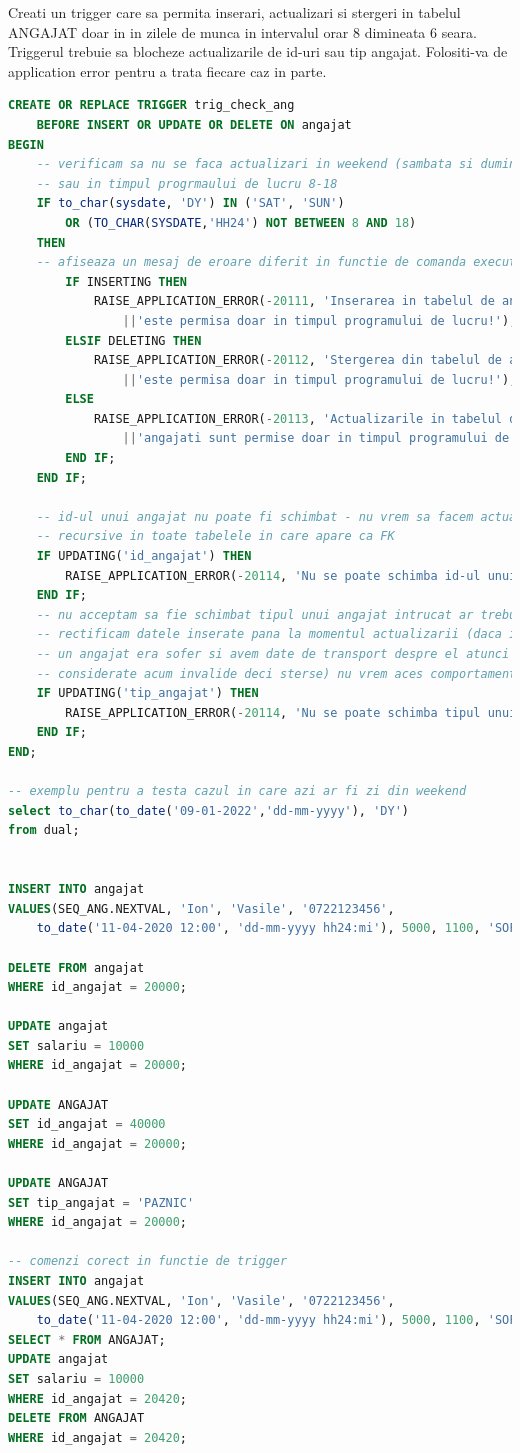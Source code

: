 \documentclass[12pt, a4paper]{article}
\begin{document}
Creati un trigger care sa permita inserari, actualizari si stergeri in
tabelul ANGAJAT doar in in zilele de munca in intervalul orar 8 dimineata
6 seara. Triggerul trebuie sa blocheze actualizarile de id-uri sau tip
angajat. Folositi-va de application error pentru a trata fiecare caz in parte.
\begin{lstlisting}[language=SQL]
CREATE OR REPLACE TRIGGER trig_check_ang
    BEFORE INSERT OR UPDATE OR DELETE ON angajat
BEGIN
    -- verificam sa nu se faca actualizari in weekend (sambata si duminica) 
    -- sau in timpul progrmaului de lucru 8-18
    IF to_char(sysdate, 'DY') IN ('SAT', 'SUN')
        OR (TO_CHAR(SYSDATE,'HH24') NOT BETWEEN 8 AND 18)
    THEN
    -- afiseaza un mesaj de eroare diferit in functie de comanda executata
        IF INSERTING THEN
            RAISE_APPLICATION_ERROR(-20111, 'Inserarea in tabelul de angajati '
                ||'este permisa doar in timpul programului de lucru!');
        ELSIF DELETING THEN
            RAISE_APPLICATION_ERROR(-20112, 'Stergerea din tabelul de angajati '
                ||'este permisa doar in timpul programului de lucru!');
        ELSE
            RAISE_APPLICATION_ERROR(-20113, 'Actualizarile in tabelul de '
                ||'angajati sunt permise doar in timpul programului de lucru!');
        END IF;
    END IF;
    
    -- id-ul unui angajat nu poate fi schimbat - nu vrem sa facem actualizari
    -- recursive in toate tabelele in care apare ca FK
    IF UPDATING('id_angajat') THEN
        RAISE_APPLICATION_ERROR(-20114, 'Nu se poate schimba id-ul unui angajat!');   
    END IF;
    -- nu acceptam sa fie schimbat tipul unui angajat intrucat ar trebuie sa 
    -- rectificam datele inserate pana la momentul actualizarii (daca inainte
    -- un angajat era sofer si avem date de transport despre el atunci ele ar fi
    -- considerate acum invalide deci sterse) nu vrem aces comportament
    IF UPDATING('tip_angajat') THEN
        RAISE_APPLICATION_ERROR(-20114, 'Nu se poate schimba tipul unui angajat!');   
    END IF;
END;

-- exemplu pentru a testa cazul in care azi ar fi zi din weekend
select to_char(to_date('09-01-2022','dd-mm-yyyy'), 'DY')
from dual;


INSERT INTO angajat
VALUES(SEQ_ANG.NEXTVAL, 'Ion', 'Vasile', '0722123456', 
    to_date('11-04-2020 12:00', 'dd-mm-yyyy hh24:mi'), 5000, 1100, 'SOFER', null);

DELETE FROM angajat
WHERE id_angajat = 20000;

UPDATE angajat
SET salariu = 10000
WHERE id_angajat = 20000;

UPDATE ANGAJAT
SET id_angajat = 40000
WHERE id_angajat = 20000;

UPDATE ANGAJAT
SET tip_angajat = 'PAZNIC'
WHERE id_angajat = 20000;

-- comenzi corect in functie de trigger
INSERT INTO angajat
VALUES(SEQ_ANG.NEXTVAL, 'Ion', 'Vasile', '0722123456', 
    to_date('11-04-2020 12:00', 'dd-mm-yyyy hh24:mi'), 5000, 1100, 'SOFER', null);
SELECT * FROM ANGAJAT;
UPDATE angajat
SET salariu = 10000
WHERE id_angajat = 20420;
DELETE FROM ANGAJAT
WHERE id_angajat = 20420;
\end{lstlisting}
\end{document}
